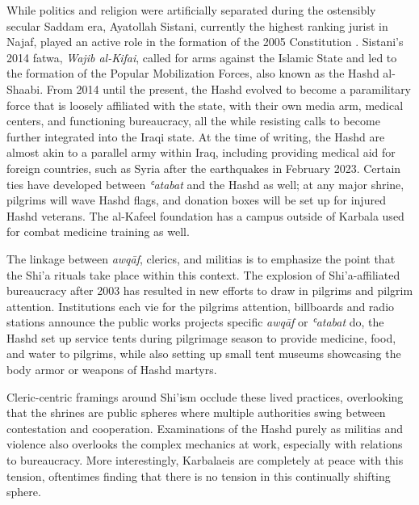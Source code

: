 
While politics and religion were artificially separated during the ostensibly secular Saddam era, Ayatollah Sistani, currently the highest ranking jurist in Najaf, played an active role in the formation of the 2005 Constitution \cite[146]{nakash_reaching_2006}. Sistani's 2014 fatwa, \emph{Wajib al-Kifai}, called for arms against the Islamic State and led to the formation of the Popular Mobilization Forces, also known as the Hashd al-Shaabi. From 2014 until the present, the Hashd evolved to become a paramilitary force that is loosely affiliated with the state, with their own media arm, medical centers, and functioning bureaucracy, all the while resisting calls to become further integrated into the Iraqi state. At the time of writing, the Hashd are almost akin to a parallel army within Iraq, including providing medical aid for foreign countries, such as Syria after the earthquakes in February 2023. Certain ties have developed between \emph{ʿatabat} and the Hashd as well; at any major shrine, pilgrims will wave Hashd flags, and donation boxes will be set up for injured Hashd veterans. The al-Kafeel foundation has a campus outside of Karbala used for combat medicine training as well. 

The linkage between \emph{awqāf}, clerics, and militias is to emphasize the point that the Shi'a rituals take place within this context. The explosion of Shi'a-affiliated bureaucracy after 2003 has resulted in new efforts to draw in pilgrims and pilgrim attention. Institutions each vie for the pilgrims attention, billboards and radio stations announce the public works projects specific \emph{awqāf} or \emph{ʿatabat} do, the Hashd set up service tents during pilgrimage season to provide medicine, food, and water to pilgrims, while also setting up small tent museums showcasing the body armor or weapons of Hashd martyrs. 

Cleric-centric framings around Shi'ism occlude these lived practices, overlooking that the shrines are public spheres where multiple authorities swing between contestation and cooperation. Examinations of the Hashd purely as militias and violence also overlooks the complex mechanics at work, especially with relations to bureaucracy. More interestingly, Karbalaeis are completely at peace with this tension, oftentimes finding that there is no tension in this continually shifting sphere.

